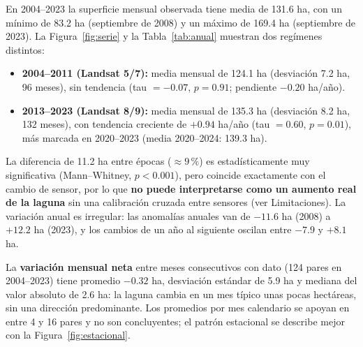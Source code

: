 \documentclass[11pt,a4paper]{article}
\begin{document}
En 2004--2023 la superficie mensual observada tiene media de 131.6 ha, con un mínimo de 83.2 ha (septiembre de 2008) y un máximo de 169.4 ha (septiembre de 2023). La Figura~\ref{fig:serie} y la Tabla~\ref{tab:anual} muestran dos regímenes distintos:

\begin{itemize}
\item \textbf{2004--2011 (Landsat 5/7):} media mensual de 124.1 ha (desviación 7.2 ha, 96 meses), sin tendencia (tau $=-0.07$, $p=0.91$; pendiente $-0.20$ ha/año).
\item \textbf{2013--2023 (Landsat 8/9):} media mensual de 135.3 ha (desviación 8.2 ha, 132 meses), con tendencia creciente de $+0.94$ ha/año (tau $=0.60$, $p=0.01$), más marcada en 2020--2023 (media 2020--2024: 139.3 ha).
\end{itemize}
La diferencia de 11.2 ha entre épocas (${\approx}9\,\%$) es estadísticamente muy significativa (Mann--Whitney, $p<0.001$), pero coincide exactamente con el cambio de sensor, por lo que \textbf{no puede interpretarse como un aumento real de la laguna} sin una calibración cruzada entre sensores (ver Limitaciones). La variación anual es irregular: las anomalías anuales van de $-11.6$ ha (2008) a $+12.2$ ha (2023), y los cambios de un año al siguiente oscilan entre $-7.9$ y $+8.1$ ha.

La \textbf{variación mensual neta} entre meses consecutivos con dato (124 pares en 2004--2023) tiene promedio $-0.32$ ha, desviación estándar de 5.9 ha y mediana del valor absoluto de 2.6 ha: la laguna cambia en un mes típico unas pocas hectáreas, sin una dirección predominante. Los promedios por mes calendario se apoyan en entre 4 y 16 pares y no son concluyentes; el patrón estacional se describe mejor con la Figura~\ref{fig:estacional}.
\end{document}
